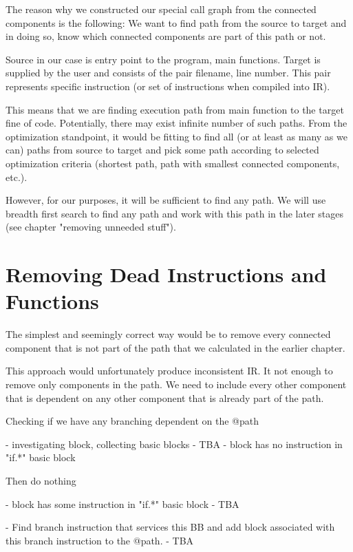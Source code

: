 \documentclass[12pt, twoside]{fithesis2}
\renewcommand{\_}{\leavevmode \kern0.07em\vbox{\hrule width0.4em}}
\begin{document}
The reason why we constructed our special call graph from the connected
components is the following: We want to find path from the source to target and
in doing so, know which connected components are part of this path or not.

Source in our case is entry point to the program, main functions. Target is
supplied by the user and consists of the pair filename, line number. This pair
represents specific instruction (or set of instructions when compiled into IR).

This means that we are finding execution path from main function to the target
fine of code. Potentially, there may exist infinite number of such paths. From
the optimization standpoint, it would be fitting to find all (or at least as
many as we can) paths from source to target and pick some path according to
selected optimization criteria (shortest path, path with smallest connected
components, etc.).

However, for our purposes, it will be sufficient to find any path. We will use
breadth first search to find any path and work with this path in the later
stages (see chapter "removing unneeded stuff").


\section{Removing Dead Instructions and Functions}
\label{sec:design-removing}


The simplest and seemingly correct way would be to remove every connected
component that is not part of the path that we calculated in the earlier
chapter.

This approach would unfortunately produce inconsistent IR. It not enough to
remove only components in the path. We need to include every other component
that is dependent on any other component that is already part of the path.

Checking if we have any branching dependent on the @path

- investigating block, collecting basic blocks
 - TBA
- block has no instruction in "if.*" basic block

Then do nothing

- block has some instruction in "if.*" basic block
 - TBA

- Find branch instruction that services this BB and add block associated with this branch instruction to the @path.
 - TBA
\end{document}
